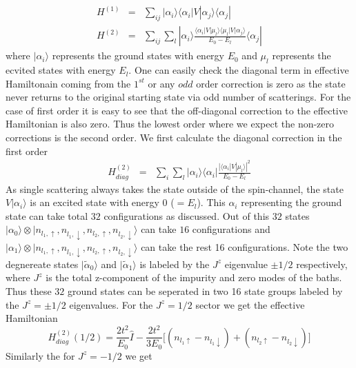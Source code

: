 \documentclass[reprint,prb,superscriptaddress]{revtex4-2}
\begin{document}
\begin{eqnarray}
H^{(1)} &=& \sum_{ij} |\alpha_i\rangle \langle \alpha_i  | V| \alpha_j \rangle \langle \alpha_j |~\nonumber\\
H^{(2)} &=& \sum_{ij} \sum_l |\alpha_i\rangle \frac{\langle \alpha_i  | V| \mu_l \rangle \langle \mu_l  | V| \alpha_j \rangle}{E_0-E_{l}}\langle \alpha_j |
\end{eqnarray}
where $|\alpha_i\rangle$ represents the ground states with energy $E_0$ and $\mu_l$ represents the ecvited states with energy $E_l$. One can easily check the diagonal term in effective Hamiltonain coming from the $1^{st}$ or any $odd$ order correction is zero as the state never returns to the original starting state via odd number of scatterings. For the case of first order it is easy to see that the off-diagonal correction to the effective Hamiltonian is also zero. Thus the lowest order where we expect the non-zero corrections is the second order. We first calculate the diagonal correction in the first order
\begin{eqnarray}
H^{(2)}_{diag} &=& \sum_{i} \sum_l |\alpha_i\rangle\langle \alpha_i | \frac{|\langle \alpha_i  | V| \mu_l \rangle|^2 }{E_0-E_{l}}
\end{eqnarray}
As single scattering always takes the state outside of the spin-channel, the state $V|\alpha_i\rangle$ is an excited state with energy $0$ ($=E_l$). This $\alpha_i$ representing the ground state can take total $32$ configurations as discussed. Out of this $32$ states $| {\alpha}_0\rangle\otimes |n_{l_1,\uparrow},n_{l_1,\downarrow},n_{l_2,\uparrow},n_{l_2,\downarrow}\rangle$ can take $16$ configurations and $| {\alpha}_1\rangle\otimes |n_{l_1,\uparrow},n_{l_1,\downarrow},n_{l_2,\uparrow},n_{l_2,\downarrow}\rangle$ can take the rest 16 configurations. Note the two degnereate states $|\tilde{\alpha}_0\rangle$  and $|\tilde{\alpha}_1\rangle$ is labeled by the $J^z$ eigenvalue $\pm 1/2$ respectively, where $J^z$ is the total z-component of the impurity and zero modes of the baths. Thus these $32$ ground states can be seperated in two 16 state groups labeled by the $J^z=\pm 1/2$ eigenvalues. For the $J^z=1/2$ sector we get the effective Hamiltonian
\begin{equation}
H^{(2)}_{diag} (1/2) = \frac{2t^2}{E_0} \hat{I} - \frac{2t^2}{3E_0} \bigg[ (n_{l_1\uparrow}-n_{l_1\downarrow}) +(n_{l_2\uparrow}-n_{l_2\downarrow}) \bigg]
\end{equation}
Similarly the for $J^z=-1/2$ we get 
\end{document}
